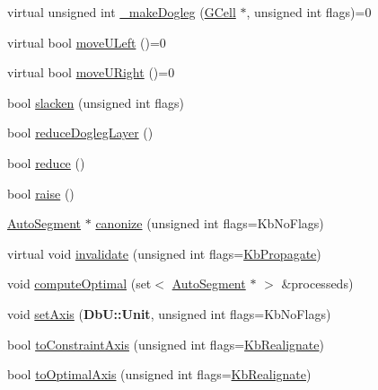 \begin{DoxyCompactItemize}
\item 
virtual unsigned int \hyperlink{classKatabatic_1_1AutoSegment_a37a14b40295ccb50cd5001891385807b}{\-\_\-make\-Dogleg} (\hyperlink{classKatabatic_1_1GCell}{G\-Cell} $\ast$, unsigned int flags)=0
\item 
virtual bool \hyperlink{classKatabatic_1_1AutoSegment_af8ca7b17e952f4b599aeeb2f4e5be395}{move\-U\-Left} ()=0
\item 
virtual bool \hyperlink{classKatabatic_1_1AutoSegment_ad7fd54ca229fcf5ccd99f87b019b9cbc}{move\-U\-Right} ()=0
\item 
bool \hyperlink{classKatabatic_1_1AutoSegment_a1fbc0adb4c0b14632edc7c55f028cd4b}{slacken} (unsigned int flags)
\item 
bool \hyperlink{classKatabatic_1_1AutoSegment_acecc9a1d55a271a4b1587d7872cfe133}{reduce\-Dogleg\-Layer} ()
\item 
bool \hyperlink{classKatabatic_1_1AutoSegment_a27a6a2c747ff93d209878a32d97e9157}{reduce} ()
\item 
bool \hyperlink{classKatabatic_1_1AutoSegment_ace393c3c082a5e62a348168354660e39}{raise} ()
\item 
\hyperlink{classKatabatic_1_1AutoSegment}{Auto\-Segment} $\ast$ \hyperlink{classKatabatic_1_1AutoSegment_a8b0d5044dce091d06b633848a6f8a66d}{canonize} (unsigned int flags=Kb\-No\-Flags)
\item 
virtual void \hyperlink{classKatabatic_1_1AutoSegment_a23599eee5a07af377fbc8d47cda7e7b0}{invalidate} (unsigned int flags=\hyperlink{namespaceKatabatic_a2af2ad6b6441614038caf59d04b3b217a3f95c1f06fe0b58b44ccbc57d99f2a5d}{Kb\-Propagate})
\item 
void \hyperlink{classKatabatic_1_1AutoSegment_a7654ca2b0787b8a9eac8629bf9218761}{compute\-Optimal} (set$<$ \hyperlink{classKatabatic_1_1AutoSegment}{Auto\-Segment} $\ast$ $>$ \&processeds)
\item 
void \hyperlink{classKatabatic_1_1AutoSegment_a3881efebb7510d9b22e5f89bcd418954}{set\-Axis} ({\bf Db\-U\-::\-Unit}, unsigned int flags=Kb\-No\-Flags)
\item 
bool \hyperlink{classKatabatic_1_1AutoSegment_a8ab41a962e18810808f4f065863b5a73}{to\-Constraint\-Axis} (unsigned int flags=\hyperlink{namespaceKatabatic_a2af2ad6b6441614038caf59d04b3b217a45a219697151531a23e997b11118e08a}{Kb\-Realignate})
\item 
bool \hyperlink{classKatabatic_1_1AutoSegment_a750983d7154c94b54537127a3a18e14b}{to\-Optimal\-Axis} (unsigned int flags=\hyperlink{namespaceKatabatic_a2af2ad6b6441614038caf59d04b3b217a45a219697151531a23e997b11118e08a}{Kb\-Realignate})

\end{DoxyCompactItemize}
